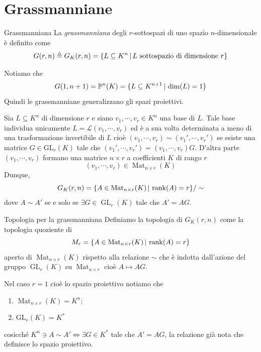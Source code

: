 \documentclass[a4paper]{article}
\begin{document}
\section{Grassmanniane}

\begin{snippetdefinition}{Grassmanniana}
    La \emph{grassmanniana} degli \(r\)-sottospazi
    di uno spazio \(n\)-dimensionale è definito come
    \[
        G(r,n) \triangleq G_K(r,n) = \{
            L \subseteq K^n  \,|\,
            L \text{ sottospazio di dimensione } r
        \}
    \]
\end{snippetdefinition}

Notiamo che
\[
    G(1, n+1) = \mathbb P^n(K)
    = \{
        L \subseteq K^{n+1} \,|\, \operatorname{dim}(L) = 1    
    \}
\]
Quindi le grassmanniane generalizzano gli spazi proiettivi.

Sia \(L \subseteq K^n\)
di dimensione \(r\)
e siano \(v_1, \cdots, v_r \in K^n\)
una base di \(L\).
Tale base individua unicamente
\(L = \mathcal L(v_1, \cdots, v_r)\)
ed è a sua volta determinata a meno di una trasformazione
invertibile di \(L\) cioè
\((v_1, \cdots, v_r) \sim (v_1', \cdots, v_r')\)
se esiste una matrice
\(G \in \text{GL}_r(K)\)
tale che \((v_1', \cdots, v_r') = (v_1, \cdots, v_r)G\).
D'altra parte \((v_1, \cdots, v_r)\)
formano una matrice
\(n \times r\) a coefficienti \(K\)
di rango \(r\)
\[
    (v_1, \cdots, v_r) \in \operatorname{Mat}_{n \times r}(K)
\]
Dunque,
\[
    G_K(r, n)
    = \{A \in \operatorname{Mat}_{n \times r}(K)
    \,|\, \operatorname{rank}(A) = r
    \} / \sim
\]
dove \(A \sim A'\) se e solo se \(\exists G \in \operatorname{GL}_r(K)\)
tale che \(A' = AG\).

\begin{snippetdefinition}{Topologia per la grassmanniana}
    Definiamo la topologia
    di \(G_K(r,n)\)
    come la topologia quoziente
    di \[
        M_r = \{
            A \in \operatorname{Mat}_{n \times r}(K)
            \,|\, \operatorname{rank}(A) = r    
        \}
    \]
    aperto di \(\operatorname{Mat}_{n \times r}(K)\)
    rispetto alla relazione \(\sim\)
    che è indotta dall'azione del gruppo
    \(\operatorname{GL}_r(K)\)
    su \(\operatorname{Mat}_{n \times r}\) cioè
    \(A \mapsto AG\).
\end{snippetdefinition}

Nel caso \(r=1\) cioè lo spazio proiettivo
notiamo che
\begin{enumerate}
    \item \(\operatorname{Mat}_{n \times r}(K) = K^n\);
    \item \(\text{GL}_r(K) = K^*\)
\end{enumerate}
cosicché
\(K^n \ni A \sim A' \iff \exists G \in K^*\)
tale che \(A' = AG\), la relazione già nota che definisce lo spazio proiettivo.
\end{document}
